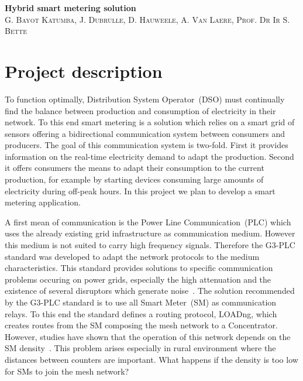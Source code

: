 \documentclass[a4paper,10pt]{article}
\begin{document}

\begin{center}
  \huge\textbf{Hybrid smart metering solution}\\
  \vspace{0.5em}
  \small\textsc{G. Bayot Katumba, J. Dubrulle, D. Hauweele, A. Van Laere, Prof. Dr Ir S. Bette}
\end{center}

\section{Project description}

To function optimally, Distribution System Operator~(DSO)
must continually find the balance between production and
consumption of electricity in their network. To this end
smart metering is a solution which relies on a smart grid of
sensors offering a bidirectional communication system
between consumers and producers. The goal of this
communication system is two-fold. First it provides
information on the real-time electricity demand to adapt the
production. Second it offers consumers the means to adapt
their consumption to the current production, for example by
starting devices consuming large amounts of electricity
during off-peak hours. In this project we plan to develop a
smart metering application.

A first mean of communication is the Power Line
Communication~(PLC) which uses the already existing grid
infrastructure as communication medium. However this medium
is not suited to carry high frequency signals. Therefore the
G3-PLC standard was developed to adapt the network protocols
to the medium characteristics. This standard provides
solutions to specific communication problems occuring on
power grids, especially the high attenuation and the
existence of several disruptors which generate
noise~\cite{itu_sim2016}. The solution recommended by the
G3-PLC standard is to use all Smart Meter~(SM) as
communication relays. To this end the standard defines a
routing protocol, LOADng, which creates routes from the SM
composing the mesh network to a Concentrator. However,
studies have shown that the operation of this network
depends on the SM density~\cite{g3plc_density2015}. This
problem arises especially in rural environment where the
distances between counters are important. What happens if
the density is too low for SMs to join the mesh network?
\end{document}
